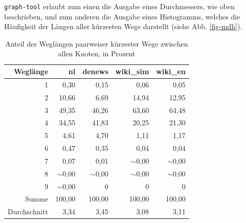 \documentclass[11pt, a4paper]{article}
\begin{document}
\texttt{graph-tool} erlaubt zum einen die Ausgabe eines Durchmessers, wie oben
beschrieben, und zum anderen die Ausgabe eines Histogramms, welches die 
Häufigkeit der Längen aller kürzesten Wege darstellt (siehe Abb. \ref{fig-mdh}).

\begin{table}[ht]
    \centering
    \begin{tabular}{*{5}{r}}
      \toprule
    Weglänge       & nl          & denews      & wiki\_sim   & wiki\_en     \\ 
      \midrule
      1            & 0,30        & 0,15        & 0,06        & 0,05         \\ 
      2            & 10,66       & 6,69        & 14,94       & 12,95        \\ 
      3            & 49,35       & 46,26       & 63,60       & 64,48        \\ 
      4            & 34,55       & 41,83       & 20,25       & 21,30        \\ 
      5            & 4,61        & 4,70        & 1,11        & 1,17         \\ 
      6            & 0,47        & 0,35        & 0,04        & 0,04         \\ 
      7            & 0,07        & 0,01        & $\sim$0,00  & $\sim$0,00   \\ 
      8            & $\sim$0,00  & $\sim$0,00  & $\sim$0,00  & $\sim$0,00   \\ 
      9            & $\sim$0,00  & 0           & 0           & 0            \\ 
      Summe        & 100,00      & 100,00      & 100,00      & 100,00       \\ 
      Durchschnitt & 3,34        & 3,45        & 3,08        & 3,11         \\
       \bottomrule
    \end{tabular}
    \caption{Anteil der Weglängen paarweiser kürzester Wege zwischen allen Knoten, in Prozent}
    \label{md-perc}
\end{table}
\end{document}
